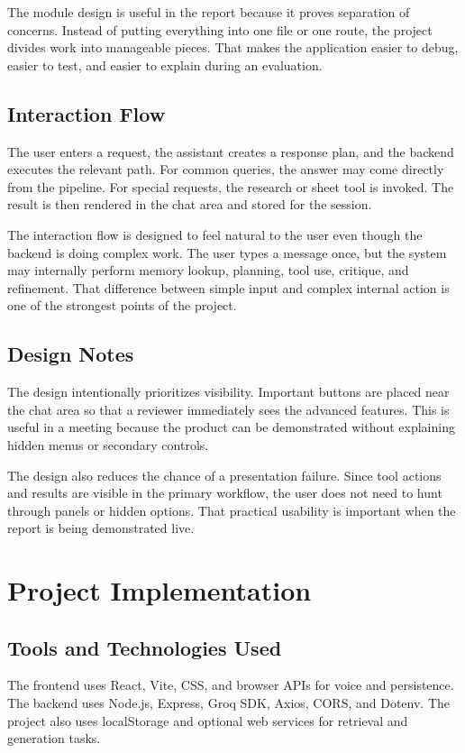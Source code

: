 \documentclass[11pt,oneside]{report}
\begin{document}
The module design is useful in the report because it proves separation of concerns. Instead of putting everything into one file or one route, the project divides work into manageable pieces. That makes the application easier to debug, easier to test, and easier to explain during an evaluation.

\section{Interaction Flow}
The user enters a request, the assistant creates a response plan, and the backend executes the relevant path. For common queries, the answer may come directly from the pipeline. For special requests, the research or sheet tool is invoked. The result is then rendered in the chat area and stored for the session.

The interaction flow is designed to feel natural to the user even though the backend is doing complex work. The user types a message once, but the system may internally perform memory lookup, planning, tool use, critique, and refinement. That difference between simple input and complex internal action is one of the strongest points of the project.

\section{Design Notes}
The design intentionally prioritizes visibility. Important buttons are placed near the chat area so that a reviewer immediately sees the advanced features. This is useful in a meeting because the product can be demonstrated without explaining hidden menus or secondary controls.

The design also reduces the chance of a presentation failure. Since tool actions and results are visible in the primary workflow, the user does not need to hunt through panels or hidden options. That practical usability is important when the report is being demonstrated live.

\chapter{Project Implementation}
\section{Tools and Technologies Used}
The frontend uses React, Vite, CSS, and browser APIs for voice and persistence. The backend uses Node.js, Express, Groq SDK, Axios, CORS, and Dotenv. The project also uses localStorage and optional web services for retrieval and generation tasks.
\end{document}
